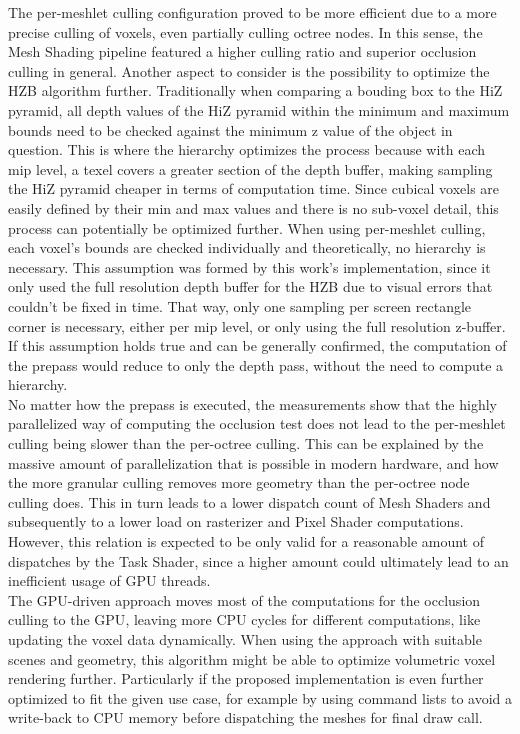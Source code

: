 \noindent
The per-meshlet culling configuration proved to be more efficient due to a more precise culling of voxels, even partially culling octree nodes.
In this sense, the Mesh Shading pipeline featured a higher culling ratio and superior occlusion culling in general. Another aspect to consider 
is the possibility to optimize the \ac{HZB} algorithm further. Traditionally when comparing a bouding box to the \ac{HiZ} pyramid, all depth 
values of the \ac{HiZ} pyramid within the minimum and maximum bounds need to be checked against the minimum z value of the object in question.
This is where the hierarchy optimizes the process because with each mip level, a texel covers a greater section of the depth buffer, making 
sampling the \ac{HiZ} pyramid cheaper in terms of computation time. Since cubical voxels are easily defined by their min and max values and 
there is no sub-voxel detail, this process can potentially be optimized further. When using per-meshlet culling, each voxel's bounds are 
checked individually and theoretically, no hierarchy is necessary. This assumption was formed by this work's implementation, since it only used 
the full resolution depth buffer for the \ac{HZB} due to visual errors that couldn't be fixed in time. That way, only one sampling per screen 
rectangle corner is necessary, either per mip level, or only using the full resolution z-buffer. If this assumption holds true and can be 
generally confirmed, the computation of the prepass would reduce to only the depth pass, without the need to compute a hierarchy. \\

\noindent
No matter how the prepass is executed, the measurements show that the highly parallelized way of computing the occlusion test does not lead to 
the per-meshlet culling being slower than the per-octree culling. This can be explained by the massive amount of parallelization that is 
possible in modern hardware, and how the more granular culling removes more geometry than the per-octree node culling does. This in turn leads 
to a lower dispatch count of Mesh Shaders and subsequently to a lower load on rasterizer and Pixel Shader computations. However, this relation 
is expected to be only valid for a reasonable amount of dispatches by the Task Shader, since a higher amount could ultimately lead to an inefficient 
usage of \ac{GPU} threads. \\

\noindent
The \ac{GPU}-driven approach moves most of the computations for the occlusion culling to the \ac{GPU}, leaving more \ac{CPU} cycles for different 
computations, like updating the voxel data dynamically. When using the approach with suitable scenes and geometry, this algorithm might be able 
to optimize volumetric voxel rendering further. Particularly if the proposed implementation is even further optimized to fit the given use case, 
for example by using command lists to avoid a write-back to \ac{CPU} memory before dispatching the meshes for final draw call. \\

